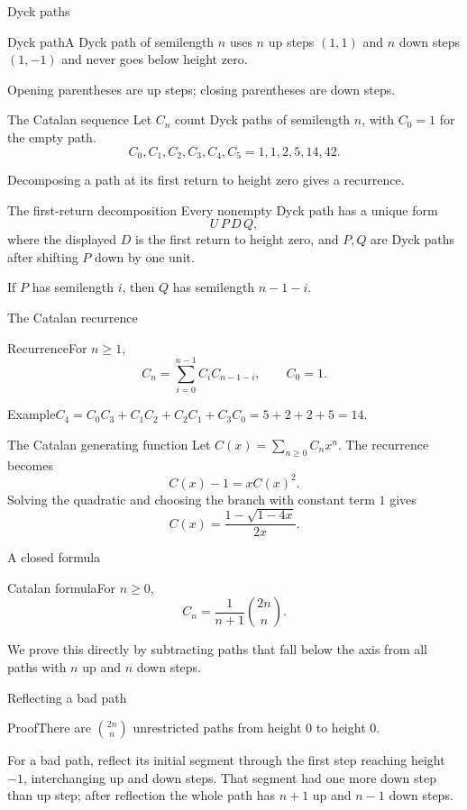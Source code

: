 \documentclass[aspectratio=169,11pt]{beamer}
\newcommand{\Def}[2]{\begin{block}{#1}#2\end{block}}
\newcommand{\Thm}[2]{\begin{block}{#1}#2\end{block}}
\renewcommand{\Proof}[1]{\begin{block}{Proof}\normalsize #1\end{block}}
\renewcommand{\Example}[1]{\begin{block}{Example}#1\end{block}}
\newcommand{\gap}{\par\medskip}
\begin{document}
\begin{frame}{Dyck paths}
\large
\Def{Dyck path}{A Dyck path of semilength $n$ uses $n$ up steps $(1,1)$ and $n$ down steps $(1,-1)$ and never goes below height zero.}
\begin{center}\end{center}
\begin{center}Opening parentheses are up steps; closing parentheses are down steps.\end{center}
\end{frame}
\begin{frame}{The Catalan sequence}
\large
Let $C_n$ count Dyck paths of semilength $n$, with $C_0=1$ for the empty path.
\[C_0,C_1,C_2,C_3,C_4,C_5=1,1,2,5,14,42.\]
\gap Decomposing a path at its first return to height zero gives a recurrence.
\end{frame}
\begin{frame}{The first-return decomposition}
\large
Every nonempty Dyck path has a unique form
\[U\,P\,D\,Q,\]
where the displayed $D$ is the first return to height zero, and $P,Q$ are Dyck paths after shifting $P$ down by one unit.
\gap If $P$ has semilength $i$, then $Q$ has semilength $n-1-i$.
\end{frame}
\begin{frame}{The Catalan recurrence}
\large
\Thm{Recurrence}{For $n\geq1$,
\[C_n=\sum_{i=0}^{n-1}C_iC_{n-1-i},\qquad C_0=1.\]}
\Example{$C_4=C_0C_3+C_1C_2+C_2C_1+C_3C_0=5+2+2+5=14$.}
\end{frame}
\begin{frame}{The Catalan generating function}
\large
Let $C(x)=\sum_{n\geq0}C_nx^n$. The recurrence becomes
\[C(x)-1=xC(x)^2.\]
Solving the quadratic and choosing the branch with constant term $1$ gives
\[C(x)=\frac{1-\sqrt{1-4x}}{2x}.\]
\end{frame}
\begin{frame}{A closed formula}
\large
\Thm{Catalan formula}{For $n\geq0$,
\[C_n=\frac1{n+1}\binom{2n}n.\]}
\gap We prove this directly by subtracting paths that fall below the axis from all paths with $n$ up and $n$ down steps.
\end{frame}
\begin{frame}{Reflecting a bad path}
\large
\Proof{There are $\binom{2n}n$ unrestricted paths from height $0$ to height $0$.\gap For a bad path, reflect its initial segment through the first step reaching height $-1$, interchanging up and down steps. That segment had one more down step than up step; after reflection the whole path has $n+1$ up and $n-1$ down steps.}
\end{frame}
\end{document}
